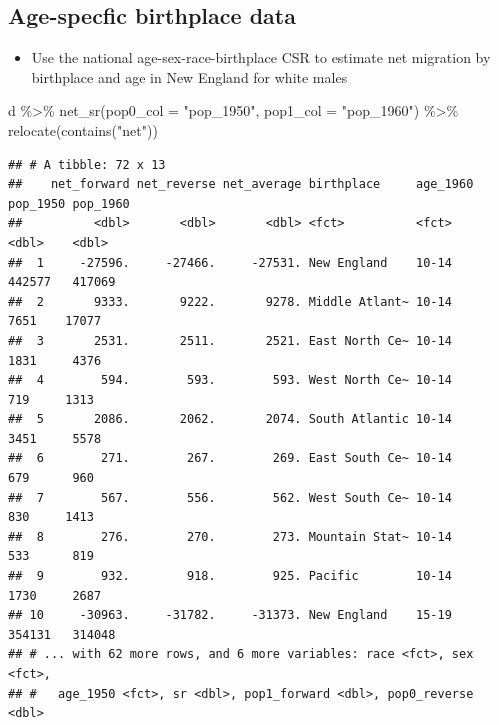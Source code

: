 \documentclass[
]{book}
\newenvironment{Shaded}{\begin{snugshade}}{\end{snugshade}}
\newcommand{\AttributeTok}[1]{\textcolor[rgb]{0.77,0.63,0.00}{#1}}
\newcommand{\FunctionTok}[1]{\textcolor[rgb]{0.00,0.00,0.00}{#1}}
\newcommand{\NormalTok}[1]{#1}
\newcommand{\SpecialCharTok}[1]{\textcolor[rgb]{0.00,0.00,0.00}{#1}}
\newcommand{\StringTok}[1]{\textcolor[rgb]{0.31,0.60,0.02}{#1}}
\providecommand{\tightlist}{%
  \setlength{\itemsep}{0pt}\setlength{\parskip}{0pt}}
\begin{document}
\hypertarget{age-specfic-birthplace-data-4}{%
\subsection{Age-specfic birthplace data}\label{age-specfic-birthplace-data-4}}

\begin{itemize}
\tightlist
\item
  Use the national age-sex-race-birthplace CSR to estimate net migration by birthplace and age in New England for white males
\end{itemize}

\begin{Shaded}
\begin{Highlighting}[]
\NormalTok{d }\SpecialCharTok{\%\textgreater{}\%}
  \FunctionTok{net\_sr}\NormalTok{(}\AttributeTok{pop0\_col =} \StringTok{"pop\_1950"}\NormalTok{, }\AttributeTok{pop1\_col =} \StringTok{"pop\_1960"}\NormalTok{) }\SpecialCharTok{\%\textgreater{}\%}
  \FunctionTok{relocate}\NormalTok{(}\FunctionTok{contains}\NormalTok{(}\StringTok{"net"}\NormalTok{))}
\end{Highlighting}
\end{Shaded}

\begin{verbatim}
## # A tibble: 72 x 13
##    net_forward net_reverse net_average birthplace     age_1960 pop_1950 pop_1960
##          <dbl>       <dbl>       <dbl> <fct>          <fct>       <dbl>    <dbl>
##  1     -27596.     -27466.     -27531. New England    10-14      442577   417069
##  2       9333.       9222.       9278. Middle Atlant~ 10-14        7651    17077
##  3       2531.       2511.       2521. East North Ce~ 10-14        1831     4376
##  4        594.        593.        593. West North Ce~ 10-14         719     1313
##  5       2086.       2062.       2074. South Atlantic 10-14        3451     5578
##  6        271.        267.        269. East South Ce~ 10-14         679      960
##  7        567.        556.        562. West South Ce~ 10-14         830     1413
##  8        276.        270.        273. Mountain Stat~ 10-14         533      819
##  9        932.        918.        925. Pacific        10-14        1730     2687
## 10     -30963.     -31782.     -31373. New England    15-19      354131   314048
## # ... with 62 more rows, and 6 more variables: race <fct>, sex <fct>,
## #   age_1950 <fct>, sr <dbl>, pop1_forward <dbl>, pop0_reverse <dbl>
\end{verbatim}
\end{document}
